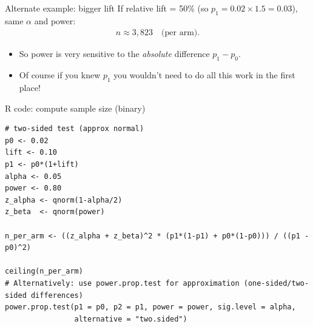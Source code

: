 \documentclass[aspectratio=169,11pt]{beamer}
\begin{document}
\begin{frame}{Alternate example: bigger lift}
  If relative lift = 50\% (so $p_1 = 0.02 \times 1.5 = 0.03$), same $\alpha$ and power:
  \begin{align*}
    n \approx 3{,}823 \quad\text{(per arm)}.
  \end{align*}

\begin{itemize}
  \item So power is very sensitive to the \emph{absolute} difference $p_1-p_0$.
  \item Of course if you knew $p_1$ you wouldn't need to do all this work in the first place!
\end{itemize}
\end{frame}

\begin{frame}[fragile]{R code: compute sample size (binary)}
\begin{lstlisting}
# two-sided test (approx normal)
p0 <- 0.02
lift <- 0.10
p1 <- p0*(1+lift)
alpha <- 0.05
power <- 0.80
z_alpha <- qnorm(1-alpha/2)
z_beta  <- qnorm(power)

n_per_arm <- ((z_alpha + z_beta)^2 * (p1*(1-p1) + p0*(1-p0))) / ((p1 - p0)^2)

ceiling(n_per_arm)
# Alternatively: use power.prop.test for approximation (one-sided/two-sided differences)
power.prop.test(p1 = p0, p2 = p1, power = power, sig.level = alpha,
                alternative = "two.sided")
\end{lstlisting}
\end{frame}
\end{document}
